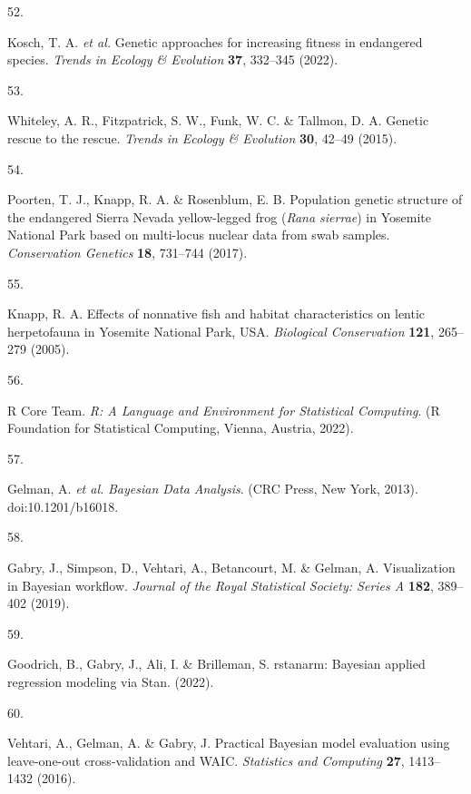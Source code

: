 \documentclass[
  letterpaper,
  DIV=11,
  numbers=noendperiod]{scrartcl}
\newlength{\cslhangindent}
\newlength{\csllabelwidth}
\newenvironment{CSLReferences}[2] %
 {\begin{list}{}{%
  \setlength{\itemindent}{0pt}
  \setlength{\leftmargin}{0pt}
  \setlength{\parsep}{0pt}
  \ifodd #1
   \setlength{\leftmargin}{\cslhangindent}
   \setlength{\itemindent}{-1\cslhangindent}
  \fi
  \setlength{\itemsep}{#2\baselineskip}}}
 {\end{list}}
\newcommand{\CSLLeftMargin}[1]{\parbox[t]{\csllabelwidth}{\strut#1\strut}}
\newcommand{\CSLRightInline}[1]{\parbox[t]{\linewidth - \csllabelwidth}{\strut#1\strut}}
\begin{document}
\begin{CSLReferences}{0}{0}
\CSLLeftMargin{52. }%
\CSLRightInline{Kosch, T. A. \emph{et al.} Genetic approaches for
increasing fitness in endangered species. \emph{Trends in Ecology \&
Evolution} \textbf{37}, 332--345 (2022).}

\CSLLeftMargin{53. }%
\CSLRightInline{Whiteley, A. R., Fitzpatrick, S. W., Funk, W. C. \&
Tallmon, D. A. Genetic rescue to the rescue. \emph{Trends in Ecology \&
Evolution} \textbf{30}, 42--49 (2015).}

\CSLLeftMargin{54. }%
\CSLRightInline{Poorten, T. J., Knapp, R. A. \& Rosenblum, E. B.
{Population genetic structure of the endangered Sierra Nevada
yellow-legged frog (\emph{{R}ana sierrae}) in Yosemite National Park
based on multi-locus nuclear data from swab samples}. \emph{Conservation
Genetics} \textbf{18}, 731--744 (2017).}

\CSLLeftMargin{55. }%
\CSLRightInline{Knapp, R. A. Effects of nonnative fish and habitat
characteristics on lentic herpetofauna in {Yosemite National Park},
{USA}. \emph{Biological Conservation} \textbf{121}, 265--279 (2005).}

\CSLLeftMargin{56. }%
\CSLRightInline{R Core Team. \emph{{R: A Language and Environment for
Statistical Computing}}. (R Foundation for Statistical Computing,
Vienna, Austria, 2022).}

\CSLLeftMargin{57. }%
\CSLRightInline{Gelman, A. \emph{et al.} \emph{Bayesian Data Analysis}.
(CRC Press, New York, 2013). doi:10.1201/b16018.}

\CSLLeftMargin{58. }%
\CSLRightInline{Gabry, J., Simpson, D., Vehtari, A., Betancourt, M. \&
Gelman, A. Visualization in {B}ayesian workflow. \emph{Journal of the
Royal Statistical Society: Series A} \textbf{182}, 389--402 (2019).}

\CSLLeftMargin{59. }%
\CSLRightInline{Goodrich, B., Gabry, J., Ali, I. \& Brilleman, S.
{r}stanarm: Bayesian applied regression modeling via {Stan}. (2022).}

\CSLLeftMargin{60. }%
\CSLRightInline{Vehtari, A., Gelman, A. \& Gabry, J. Practical
{B}ayesian model evaluation using leave-one-out cross-validation and
{WAIC}. \emph{Statistics and Computing} \textbf{27}, 1413--1432 (2016).}


\end{CSLReferences}
\end{document}
